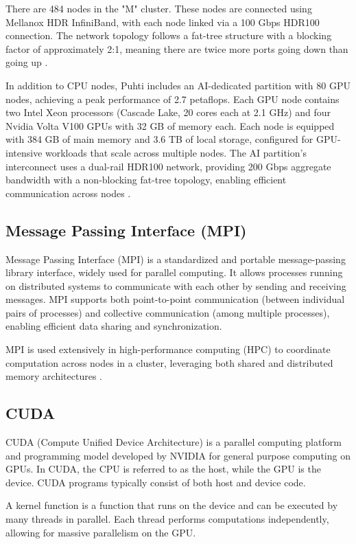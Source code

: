 \documentclass[english, 12pt, a4paper, elec, utf8, a-2b, online]{aaltothesis}
\begin{document}
There are 484 nodes in the "M" cluster. These nodes are connected using Mellanox HDR InfiniBand, with each node linked via a 100 Gbps HDR100 connection. The network topology follows a fat-tree structure with a blocking factor of approximately 2:1, meaning there are twice more ports going down than going up \cite{PuhtiDoc} \cite{FatTrees}. 

In addition to CPU nodes, Puhti includes an AI-dedicated partition with 80 GPU nodes, achieving a peak performance of 2.7 petaflops. Each GPU node contains two Intel Xeon processors (Cascade Lake, 20 cores each at 2.1 GHz) and four Nvidia Volta V100 GPUs with 32 GB of memory each. Each node is equipped with 384 GB of main memory and 3.6 TB of local storage, configured for GPU-intensive workloads that scale across multiple nodes. The AI partition’s interconnect uses a dual-rail HDR100 network, providing 200 Gbps aggregate bandwidth with a non-blocking fat-tree topology, enabling efficient communication across nodes \cite{PuhtiDoc}.

\subsection{Message Passing Interface (MPI)}
Message Passing Interface (MPI) is a standardized and portable message-passing library interface, widely used for parallel computing. It allows processes running on distributed systems to communicate with each other by sending and receiving messages. MPI supports both point-to-point communication (between individual pairs of processes) and collective communication (among multiple processes), enabling efficient data sharing and synchronization.

MPI is used extensively in high-performance computing (HPC) to coordinate computation across nodes in a cluster, leveraging both shared and distributed memory architectures \cite{MPI}.

\subsection{CUDA}

CUDA (Compute Unified Device Architecture) is a parallel computing platform and programming model developed by NVIDIA for general purpose computing on GPUs. In CUDA, the CPU is referred to as the host, while the GPU is the device. CUDA programs typically consist of both host and device code. 

A kernel function is a function that runs on the device and can be executed by many threads in parallel. Each thread performs computations independently, allowing for massive parallelism on the GPU. 
\end{document}
